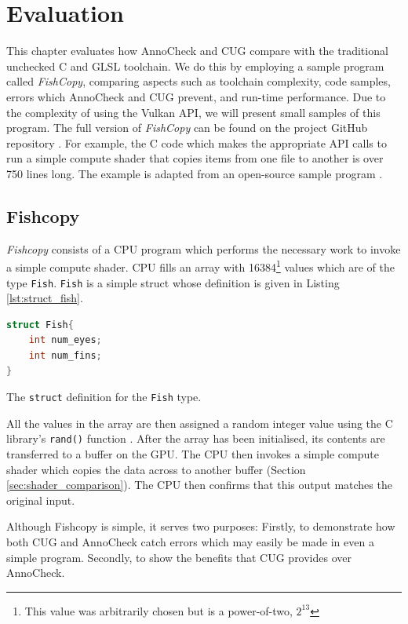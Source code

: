 \documentclass[a4paper,12pt,twoside,openright]{report}
\begin{document}
\chapter{Evaluation}

\label{chp:evaluation}

This chapter evaluates how AnnoCheck and CUG compare with the traditional
unchecked C and GLSL toolchain. We do this by employing a sample program called
\textit{FishCopy}, comparing aspects such as toolchain complexity, code
samples, errors which AnnoCheck and CUG prevent, and run-time performance. Due
to the complexity of using the Vulkan API, we will present small samples of
this program. The full version of \textit{FishCopy} can be found on the project
GitHub repository \cite{ProjectSource}. For example, the C code which makes the
appropriate API calls to run a simple compute shader that copies items from one
file to another is over 750 lines long. The example is adapted from an
open-source sample program \cite{VulkanComputeExampleSource}.

\section{Fishcopy}

\textit{Fishcopy} consists of a CPU program which performs the necessary work
to invoke a simple compute shader. CPU fills an array with 16384\footnote{This
value was arbitrarily chosen but is a power-of-two, $2^{13}$} values which are
of the type \texttt{Fish}. \texttt{Fish} is a simple struct whose definition is
given in Listing \ref{lst:struct_fish}.

\begin{lstfloat}
\begin{lstlisting}[language=C]
struct Fish{
    int num_eyes;
    int num_fins;
}
\end{lstlisting}
\caption{The \texttt{struct} definition for the \texttt{Fish} type.}
\label{lst:struct_fish}
\end{lstfloat}

All the values in the array are then assigned a random integer value using the
C library's \texttt{rand()} function \cite{RandRef}. After the array has been
initialised, its contents are transferred to a buffer on the GPU. The CPU then
invokes a simple compute shader which copies the data across to another buffer
(Section \ref{sec:shader_comparison}). The CPU then confirms that this output
matches the original input.

Although Fishcopy is simple, it serves two purposes: Firstly, to demonstrate
how both CUG and AnnoCheck catch errors which may easily be made in even a
simple program. Secondly, to show the benefits that CUG provides over
AnnoCheck.
\end{document}
